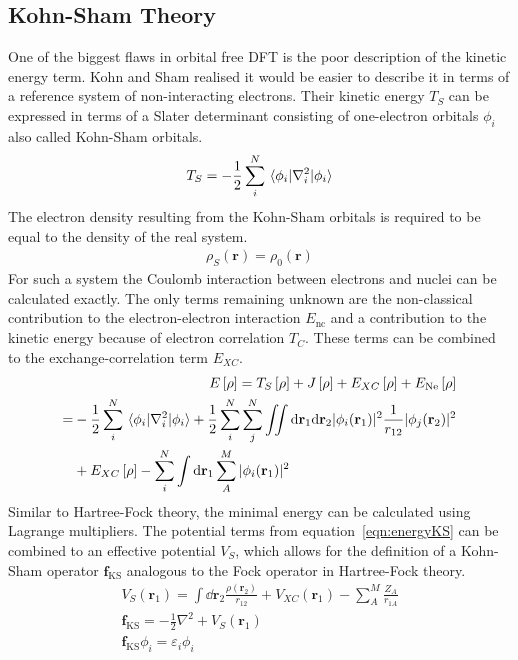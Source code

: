 \subsection{Kohn-Sham Theory}
\label{sec:kohnshamtheory}

One of the biggest flaws in orbital free \ac{DFT} is the poor description of
the kinetic energy term. Kohn and Sham realised it would be easier to describe
it in terms of a reference system of non-interacting electrons. Their kinetic
energy $T_S$ can be expressed in terms of a Slater determinant consisting of
one-electron orbitals $\phi_i$ also called Kohn-Sham orbitals.
%
\begin{align}
    T_S=-\frac{1}{2}\sum_i^N\mel{\phi_i}{\nabla_i^2}{\phi_i}
\end{align}
%
The electron density resulting from the Kohn-Sham orbitals is required to be
equal to the density of the real system.
%
\begin{align}
    \rho_S(\mathbf{r}) = \rho_0(\mathbf{r})
\end{align}
%
For such a system the Coulomb interaction between electrons and nuclei can be
calculated exactly. The only terms remaining unknown are the non-classical
contribution to the electron-electron interaction $E_\text{nc}$ and a
contribution to the kinetic energy because of electron correlation $T_C$. These
terms can be combined to the exchange-correlation term $E_{XC}$.
%
\begin{align}
    E\left[\rho\right]=T_S\left[\rho\right] + J\left[\rho\right] + E_{XC}\left[\rho\right] + E_\text{Ne}\left[\rho\right] \\
    \begin{aligned}
        =&-\frac{1}{2}\sum_i^N\mel{\phi_i}{\nabla_i^2}{\phi_i} + \frac{1}{2}\sum_i^N\sum_j^N\iint \dd\mathbf{r}_1\dd\mathbf{r}_2|\phi_i(\mathbf{r}_1)|^2\frac{1}{r_{12}}|\phi_j(\mathbf{r}_2)|^2 \\
        &+ E_{XC}\left[\rho\right] - \sum_i^N\int\dd\mathbf{r}_1\sum_A^M|\phi_i(\mathbf{r}_1)|^2
    \end{aligned}\label{eqn:energyKS}
\end{align}
%
Similar to Hartree-Fock theory, the minimal energy can be calculated using
Lagrange multipliers. The potential terms from equation~\eqref{eqn:energyKS}
can be combined to an effective potential $V_S$, which allows for the
definition of a Kohn-Sham operator $\mathbf{f}_\text{KS}$ analogous to the Fock
operator in Hartree-Fock theory.
%
\begin{align}
    V_S(\mathbf{r}_1) = \int\dd\mathbf{r}_2\frac{\rho(\mathbf{r}_2)}{r_{12}} + V_{XC}(\mathbf{r}_1) - \sum_A^M\frac{Z_A}{r_{1A}}\\
    \mathbf{f}_\text{KS} = -\frac{1}{2}\nabla^2+V_S(\mathbf{r}_1)\\
    \mathbf{f}_\text{KS}\phi_i=\varepsilon_i\phi_i
\end{align}
